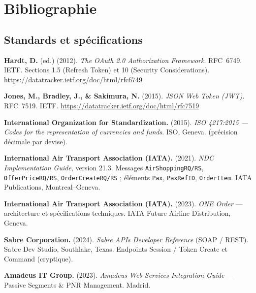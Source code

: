 \chapter*{Bibliographie}

\section*{Standards et spécifications}
\begin{enumerate}[label={[\arabic*]},leftmargin=*,itemsep=5pt]
    \item \textbf{Hardt, D.} (ed.) (2012). \textit{The OAuth 2.0 Authorization Framework}. RFC~6749. IETF. Sections 1.5 (Refresh Token) et 10 (Security Considerations). \url{https://datatracker.ietf.org/doc/html/rfc6749}
    \item \textbf{Jones, M., Bradley, J., \& Sakimura, N.} (2015). \textit{JSON Web Token (JWT)}. RFC~7519. IETF. \url{https://datatracker.ietf.org/doc/html/rfc7519}
    \item \textbf{International Organization for Standardization.} (2015). \textit{ISO 4217:2015 --- Codes for the representation of currencies and funds}. ISO, Geneva. (précision décimale par devise).
    \item \textbf{International Air Transport Association (IATA).} (2021). \textit{NDC Implementation Guide}, version 21.3. Messages \texttt{AirShoppingRQ/RS}, \texttt{OfferPriceRQ/RS}, \texttt{OrderCreateRQ/RS} ; éléments \texttt{Pax}, \texttt{PaxRefID}, \texttt{OrderItem}. IATA Publications, Montreal--Geneva.
    \item \textbf{International Air Transport Association (IATA).} (2023). \textit{ONE Order} --- architecture et spécifications techniques. IATA Future Airline Distribution, Geneva.
    \item \textbf{Sabre Corporation.} (2024). \textit{Sabre APIs Developer Reference} (SOAP / REST). Sabre Dev Studio, Southlake, Texas. Endpoints Session / Token Create et Command (cryptique).
    \item \textbf{Amadeus IT Group.} (2023). \textit{Amadeus Web Services Integration Guide} --- Passive Segments \& PNR Management. Madrid.
\end{enumerate}


